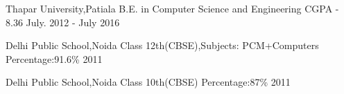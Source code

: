 \begin{cventries}
  \cventry
    {Thapar University,Patiala}
    {B.E. in Computer Science and Engineering}
   {CGPA - 8.36}
    {July. 2012 - July 2016}
  {
      \begin{cvitems}
       \item []
      \end{cvitems}
    }
    
  \cventry
    {Delhi Public School,Noida}
    {Class 12th(CBSE),Subjects: PCM+Computers}
   {Percentage:91.6\%}
    { 2011}
    {
      \begin{cvitems}
        \item []
      \end{cvitems}
    }\linespread{0.5}
    \cventry
    {Delhi Public School,Noida}
    {Class 10th(CBSE)}
   {Percentage:87\%}
    { 2011}
    {
      \begin{cvitems}
        \item []
      \end{cvitems}
    }
\end{cventries}